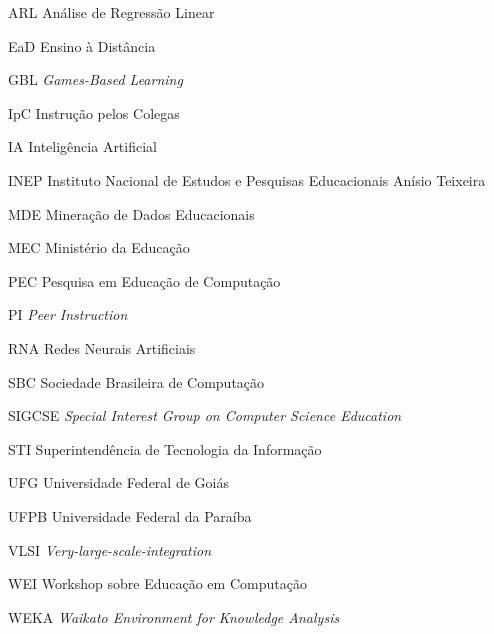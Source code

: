 \documentclass[
	12pt,				%
	oneside,
	a4paper,			%
    sumario=tradicional,%
	chapter=TITLE,		%
	english,			%
	french,				%
	spanish,			%
	brazil,				%
	]{abntex2}
\begin{document}
\listoffigures*
\cleardoublepage

\listoftables*
\cleardoublepage

\begin{siglas}

  \item[ARL] Análise de Regressão Linear
  \item[EaD] Ensino à Distância
  \item[GBL] \textit{Games-Based Learning}
  \item[IpC] Instrução pelos Colegas
  \item[IA] Inteligência Artificial
  \item[INEP] Instituto Nacional de Estudos e Pesquisas Educacionais Anísio Teixeira
  \item[MDE] Mineração de Dados Educacionais
  \item[MEC] Ministério da Educação
  \item[PEC] Pesquisa em Educação de Computação
  \item[PI] \textit{Peer Instruction}
  \item[RNA] Redes Neurais Artificiais
\item[SBC]	Sociedade Brasileira de Computação
  \item[SIGCSE] \textit{Special Interest Group on Computer Science Education}
   \item[STI] Superintendência de Tecnologia da Informação
  \item[UFG] Universidade Federal de Goiás
  \item[UFPB] Universidade Federal da Paraíba
  \item[VLSI] \textit{Very-large-scale-integration}
  \item[WEI] Workshop sobre Educação em Computação
  \item[WEKA] \textit{Waikato Environment for Knowledge Analysis}



\end{siglas}

\end{document}

